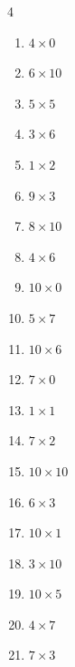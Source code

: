 \begin{multicols}{4}
\begin{enumerate}
  \item $4\times 0$
        \phantom{$=0$}

  \item $6\times 10$
        \phantom{$=60$}

  \item $5\times 5$
        \phantom{$=25$}

  \item $3\times 6$
        \phantom{$=18$}

  \item $1\times 2$
        \phantom{$=2$}

  \item $9\times 3$
        \phantom{$=27$}

  \item $8\times 10$
        \phantom{$=80$}

  \item $4\times 6$
        \phantom{$=24$}

  \item $10\times 0$
        \phantom{$=0$}

  \item $5\times 7$
        \phantom{$=35$}

  \item $10\times 6$
        \phantom{$=60$}

  \item $7\times 0$
        \phantom{$=0$}

  \item $1\times 1$
        \phantom{$=1$}

  \item $7\times 2$
        \phantom{$=14$}

  \item $10\times 10$
        \phantom{$=100$}

  \item $6\times 3$
        \phantom{$=18$}

  \item $10\times 1$
        \phantom{$=10$}

  \item $3\times 10$
        \phantom{$=30$}

  \item $10\times 5$
        \phantom{$=50$}

  \item $4\times 7$
        \phantom{$=28$}

  \item $7\times 3$
        \phantom{$=21$}


\end{enumerate}
\end{multicols}
